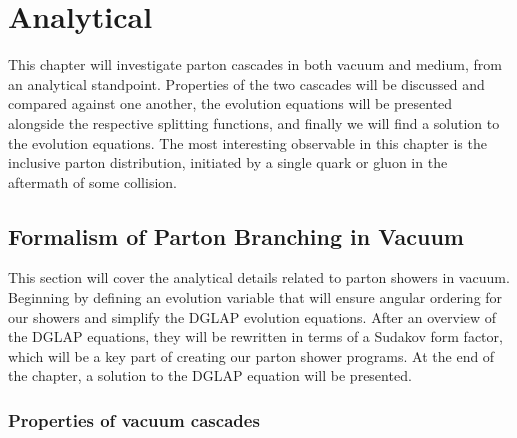 \documentclass[main.tex]{subfiles}
\begin{document}
\chapter{Analytical}\label{cpt:ana}
This chapter will investigate parton cascades in both vacuum and medium, from an analytical standpoint. Properties of the two cascades will be discussed and compared against one another, the evolution equations will be presented alongside the respective splitting functions, and finally we will find a solution to the evolution equations. The most interesting observable in this chapter is the inclusive parton distribution, initiated by a single quark or gluon in the aftermath of some collision. 
\section{Formalism of Parton Branching in Vacuum}
This section will cover the analytical details related to parton showers in vacuum. Beginning by defining an evolution variable that will ensure angular ordering for our showers and simplify the DGLAP evolution equations. After an overview of the DGLAP equations, they will be rewritten in terms of a Sudakov form factor, which will be a key part of creating our parton shower programs. At the end of the chapter, a solution to the DGLAP equation will be presented.

\subsection{Properties of vacuum cascades}
\end{document}
